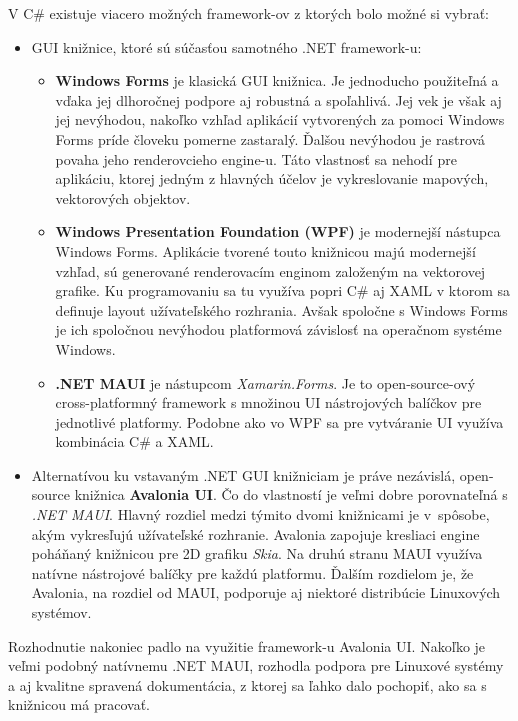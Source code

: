 V C\# existuje viacero možných framework-ov z ktorých bolo možné si vybrať:
\begin{itemize}
    \item GUI knižnice, ktoré sú súčasťou samotného .NET framework-u:
    \begin{itemize}
        \item \textbf{Windows Forms} je klasická GUI knižnica. Je jednoducho použiteľná a vďaka jej dlhoročnej podpore aj robustná a spoľahlivá. Jej vek je však aj jej nevýhodou, nakoľko vzhľad aplikácií vytvorených za pomoci Windows Forms príde človeku pomerne zastaralý. Ďalšou nevýhodou je rastrová povaha jeho renderovcieho engine-u. Táto vlastnosť sa nehodí pre aplikáciu, ktorej jedným z hlavných účelov je vykreslovanie mapových, vektorových objektov.     
        \item \textbf{Windows Presentation Foundation (WPF)} je modernejší nástupca Windows Forms. Aplikácie tvorené touto knižnicou majú modernejší vzhľad, sú generované renderovacím enginom založeným na vektorovej grafike. Ku programovaniu sa tu využíva popri C\# aj XAML v ktorom sa definuje layout užívateľského rozhrania. Avšak spoločne s Windows Forms je ich spoločnou nevýhodou platformová závislosť na operačnom systéme Windows.
        \item \textbf{.NET MAUI} je nástupcom \textit{Xamarin.Forms}. Je to open-source-ový cross-platformný framework s množinou UI nástrojových balíčkov pre jednotlivé platformy. Podobne ako vo WPF sa pre vytváranie UI využíva kombinácia C\# a XAML. 
    \end{itemize}
    \item Alternatívou ku vstavaným .NET GUI knižniciam je práve nezávislá, open-source knižnica \textbf{Avalonia UI}. Čo do vlastností je veľmi dobre porovnateľná s \textit{.NET MAUI}. Hlavný rozdiel medzi týmito dvomi knižnicami je v~spôsobe, akým vykresľujú užívateľské rozhranie. Avalonia zapojuje kresliaci engine poháňaný knižnicou pre 2D grafiku \textit{Skia}. Na druhú stranu MAUI využíva natívne nástrojové balíčky pre každú platformu. Ďalším rozdielom je, že Avalonia, na rozdiel od MAUI, podporuje aj niektoré distribúcie Linuxových systémov.
\end{itemize}

Rozhodnutie nakoniec padlo na využitie framework-u Avalonia UI. Nakoľko je veľmi podobný natívnemu .NET MAUI, rozhodla podpora pre Linuxové systémy a aj kvalitne spravená dokumentácia, z ktorej sa ľahko dalo pochopiť, ako sa s knižnicou má pracovať. 

